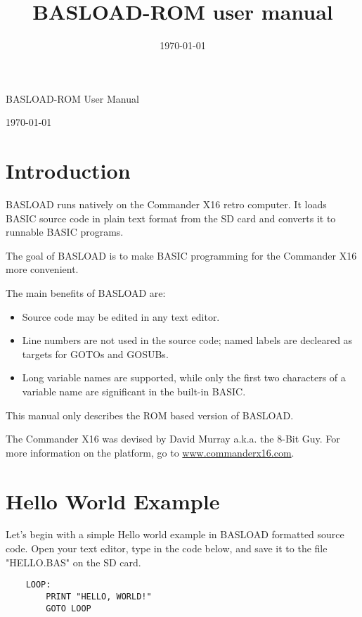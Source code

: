 \documentclass{article}
\title{BASLOAD-ROM user manual}
\date{\today}
\begin{document}
\begin{huge}
    BASLOAD-ROM User Manual
\end{huge}

\vspace{1em}
\today

\vspace{4em}
\tableofcontents
\vspace{4em}

\section{Introduction}

    BASLOAD runs natively on the Commander X16 retro computer. It loads BASIC 
    source code in plain text format from the SD card and converts it to 
    runnable BASIC programs.

    The goal of BASLOAD is to make BASIC programming for the Commander X16 more convenient.

    The main benefits of BASLOAD are:

    \begin{itemize}
        \item Source code may be edited in any text editor.
        \item Line numbers are not used in the source code; named labels are 
              decleared as targets for GOTOs and GOSUBs.
        \item Long variable names are supported, while only the first two 
              characters of a variable name are significant in the built-in 
              BASIC.
    \end{itemize}
    
    This manual only describes the ROM based version of BASLOAD.

    The Commander X16 was devised by David Murray a.k.a. the 
    8-Bit Guy. For more information on the platform, go to 
    \href{http://www.commanderx16.com}{www.commanderx16.com}.

\section{Hello World Example}

    Let's begin with a simple Hello world example in BASLOAD formatted
    source code. Open your text editor, type in the code below, and save it to
    the file "HELLO.BAS" on the SD card.

    \begin{verbatim}
    LOOP:
        PRINT "HELLO, WORLD!"
        GOTO LOOP
    \end{verbatim}
\end{document}
